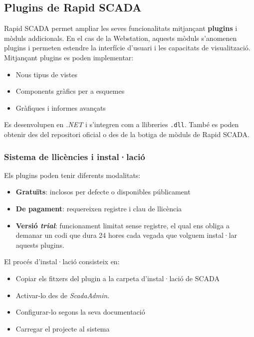 \documentclass[a4paper,11pt,DIV=13,headings=normal,abstract=true,twoside=semi]{article}
\begin{document}
\subsection{Plugins de Rapid SCADA}


Rapid SCADA permet ampliar les seves funcionalitats mitjançant \textbf{plugins} i mòduls addicionals. En el cas de la Webstation, aquests mòduls s'anomenen plugins i permeten estendre la interfície d'usuari i les capacitats de visualització. Mitjançant plugins es poden implementar:
\begin{itemize}
    \item Nous tipus de vistes
    \item Components gràfics per a esquemes
    \item Gràfiques i informes avançats
\end{itemize}

Es desenvolupen en \textit{.NET} \cite{rapidscada_dev_basics} i s'integren com a llibreries \texttt{.dll}. També es poden obtenir des del repositori oficial o des de la botiga de mòduls de Rapid SCADA.

\subsubsection{Sistema de llicències i instal·lació}

Els plugins poden tenir diferents modalitats:
\begin{itemize}
    \item \textbf{Gratuïts}: inclosos per defecte o disponibles públicament
    \item \textbf{De pagament}: requereixen registre i clau de llicència
    \item \textbf{Versió \textit{trial}}: funcionament limitat sense registre, el qual ens obliga a demanar un codi que dura 24 hores cada vegada que volguem instal·lar aquests plugins. 
\end{itemize}

El procés d'instal·lació consisteix en:
\begin{itemize}
    \item Copiar els fitxers del plugin a la carpeta d'instal·lació de SCADA
    \item Activar-lo des de \textit{ScadaAdmin}.
    \item Configurar-lo segons la seva documentació
    \item Carregar el projecte al sistema
\end{itemize}
\end{document}
